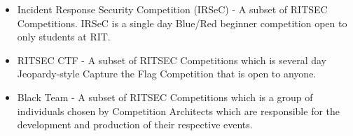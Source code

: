 \begin{itemize}
  \item Incident Response Security Competition (IRSeC) - A subset of RITSEC 
    Competitions. IRSeC is a single day Blue/Red 
    beginner competition open to only students at RIT.

  \item RITSEC CTF - A subset of RITSEC Competitions which is several day
    Jeopardy-style Capture the Flag Competition that is open to anyone.
  
  \item Black Team - A subset of RITSEC Competitions which is a group of 
    individuals chosen by Competition Architects which are responsible for the
    development and production of their respective events.

\end{itemize}
